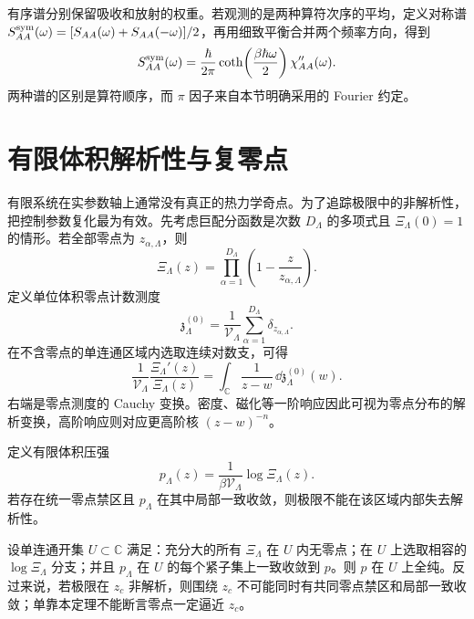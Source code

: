 有序谱分别保留吸收和放射的权重。若观测的是两种算符次序的平均，定义对称谱 \(S_{AA}^{\rm sym}(\omega)=[S_{AA}(\omega)+S_{AA}(-\omega)]/2\)，再用细致平衡合并两个频率方向，得到
\[
S_{AA}^{\rm sym}(\omega)
=\frac{\hbar}{2\pi}\coth\!\left(\frac{\beta\hbar\omega}{2}\right)
\chi''_{AA}(\omega).
\]
两种谱的区别是算符顺序，而 \(\pi\) 因子来自本节明确采用的 Fourier 约定。

\section{有限体积解析性与复零点}

有限系统在实参数轴上通常没有真正的热力学奇点。为了追踪极限中的非解析性，把控制参数复化最为有效。先考虑巨配分函数是次数 \(D_\Lambda\) 的多项式且 \(\Xi_\Lambda(0)=1\) 的情形。若全部零点为 \(z_{\alpha,\Lambda}\)，则
\begin{equation}
 \Xi_\Lambda(z)
 =\prod_{\alpha=1}^{D_\Lambda}
 \left(1-\frac{z}{z_{\alpha,\Lambda}}\right).
 \label{eq:phys-sm-finite-zero-factorization}
\end{equation}
定义单位体积零点计数测度
\begin{equation}
 \mathfrak z_\Lambda^{(0)}
 =\frac{1}{\mathcal V_\Lambda}
 \sum_{\alpha=1}^{D_\Lambda}\delta_{z_{\alpha,\Lambda}}.
 \label{eq:phys-sm-zero-measure}
\end{equation}
在不含零点的单连通区域内选取连续对数支，可得
\begin{equation}
 \frac{1}{\mathcal V_\Lambda}
 \frac{\Xi_\Lambda'(z)}{\Xi_\Lambda(z)}
 =\int_{\mathbb C}\frac{1}{z-w}\,
 \dd\mathfrak z_\Lambda^{(0)}(w).
 \label{eq:phys-sm-zero-cauchy-transform}
\end{equation}
右端是零点测度的 Cauchy 变换。密度、磁化等一阶响应因此可视为零点分布的解析变换，高阶响应则对应更高阶核 \((z-w)^{-n}\)。

定义有限体积压强
\begin{equation}
 p_\Lambda(z)=\frac{1}{\beta\mathcal V_\Lambda}\log\Xi_\Lambda(z).
 \label{eq:phys-sm-pressure-finite-general}
\end{equation}
若存在统一零点禁区且 \(p_\Lambda\) 在其中局部一致收敛，则极限不能在该区域内部失去解析性。

\begin{theorem}[共同零点禁区中的解析极限]
\label{thm:phys-sm-zero-free-analyticity}
设单连通开集 \(U\subset\mathbb C\) 满足：充分大的所有 \(\Xi_\Lambda\) 在 \(U\) 内无零点；在 \(U\) 上选取相容的 \(\log\Xi_\Lambda\) 分支；并且 \(p_\Lambda\) 在 \(U\) 的每个紧子集上一致收敛到 \(p\)。则 \(p\) 在 \(U\) 上全纯。反过来说，若极限在 \(z_c\) 非解析，则围绕 \(z_c\) 不可能同时有共同零点禁区和局部一致收敛；单靠本定理不能断言零点一定逼近 \(z_c\)。
\end{theorem}

